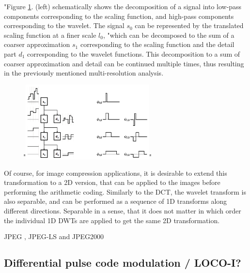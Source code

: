       "Figure \ref{fig:wavelet}. (left) schematically shows the decomposition of a signal into low-pass components corresponding to the scaling function, and high-pass components corresponding to the wavelet. The signal $s_0$ can be represented by the translated scaling function at a finer scale $l_0$, "which can be decomposed to the sum of a coarser approximation $s_1$ corresponding to the scaling function and the detail part $d_1$ corresponding to the wavelet functions. This decomposition to a sum of coarser approximation and detail can be continued multiple times, thus resulting in the previously mentioned multi-resolution analysis.


      \begin{figure}
        \centering
        "\includegraphics[width=0.6\textwidth]{wavelet}"
        \label{fig:wavelet}
      \end{figure}


      Of course, for image compression applications, it is desirable to extend this transformation to a 2D version, that can be applied to the images before performing the arithmetic coding. Similarly to the DCT, the wavelet transform is also separable, and can be performed as a sequence of 1D transforms along different directions. Separable in a sense, that it does not matter in which order the individual 1D DWTs are applied to get the same 2D transformation.

      JPEG \cite{pennebaker_jpeg:_1992}, JPEG-LS \cite{weinberger_loco-i_2000} and JPEG2000

  \subsection{Differential pulse code modulation / LOCO-I?}

